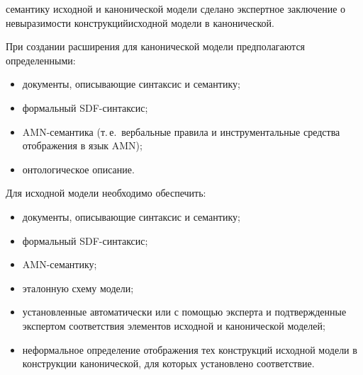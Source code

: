 \begin{multicols}{2}
\begin{enumerate}[1.]
\begin{itemize}
семантику исходной и канонической модели сделано экспертное заключение
о невыразимости конструкций\linebreak исходной модели в канонической.
\end{itemize}
При создании расширения для канонической модели предполагаются определенными:
\begin{itemize}
\item документы, описывающие синтаксис и семантику;
\item формальный SDF-синтаксис;
\item AMN-семантика (т.\,е.\ вербальные правила и
инструментальные средства отображения в язык AMN);
\item онтологическое описание.
\end{itemize}

\noindent
Для исходной модели необходимо обеспечить:
\begin{itemize}
\item документы, описывающие синтаксис и семантику;
\item формальный SDF-синтаксис;
\item AMN-семантику;
\item эталонную схему модели;
\item установленные автоматически или с по\-мощью эксперта и подтвержденные
экспертом соответствия элементов исходной и канонической моделей;
\item неформальное определение отображения тех конструкций исходной модели в
конструкции канонической, для которых установлено соответствие.
\end{itemize}


\end{enumerate}
\end{multicols}

